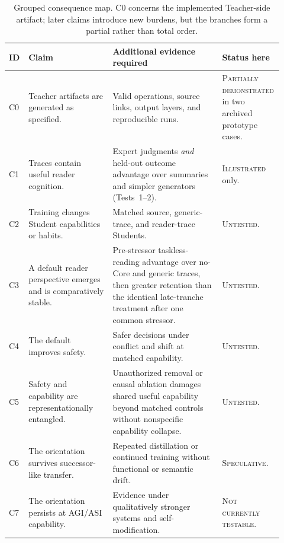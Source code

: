\documentclass[11pt]{article}
\newcommand{\statusIllustrated}{\textcolor{hypothesisBlue}{\textsc{Illustrated}}}
\newcommand{\statusUntested}{\textcolor{hypothesisBlue}{\textsc{Untested}}}
\newcommand{\statusSpeculative}{\textcolor{speculationPurple}{\textsc{Speculative}}}
\newcommand{\statusNotTestable}{\textcolor{speculationPurple}{\textsc{Not currently testable}}}
\begin{document}
\begin{table}[ht]
\centering
\small
\begin{tabular}{@{}>{\raggedright\arraybackslash}p{0.07\linewidth}
                    >{\raggedright\arraybackslash}p{0.30\linewidth}
                    >{\raggedright\arraybackslash}p{0.39\linewidth}
                    >{\raggedright\arraybackslash}p{0.16\linewidth}@{}}
\toprule
\textbf{ID} & \textbf{Claim} & \textbf{Additional evidence required} & \textbf{Status here} \\
\midrule
C0 & Teacher artifacts are generated as specified. & Valid operations, source links, output layers, and reproducible runs. & \textcolor{hypothesisBlue}{\textsc{Partially demonstrated}} in two archived prototype cases. \\
C1 & Traces contain useful reader cognition. & Expert judgments \emph{and} held-out outcome advantage over summaries and simpler generators (Tests~1--2). & \statusIllustrated{} only. \\
C2 & Training changes Student capabilities or habits. & Matched source, generic-trace, and reader-trace Students. & \statusUntested. \\
C3 & A default reader perspective emerges and is comparatively stable. & Pre-stressor taskless-reading advantage over no-Core and generic traces, then greater retention than the identical late-tranche treatment after one common stressor. & \statusUntested. \\
C4 & The default improves safety. & Safer decisions under conflict and shift at matched capability. & \statusUntested. \\
C5 & Safety and capability are representationally entangled. & Unauthorized removal or causal ablation damages shared useful capability beyond matched controls without nonspecific capability collapse. & \statusUntested. \\
C6 & The orientation survives successor-like transfer. & Repeated distillation or continued training without functional or semantic drift. & \statusSpeculative. \\
C7 & The orientation persists at AGI/ASI capability. & Evidence under qualitatively stronger systems and self-modification. & \statusNotTestable. \\
\bottomrule
\end{tabular}
\caption{Grouped consequence map. C0 concerns the implemented Teacher-side artifact; later claims introduce new burdens, but the branches form a partial rather than total order.}
\label{tab:consequence-ladder}
\end{table}
\end{document}
